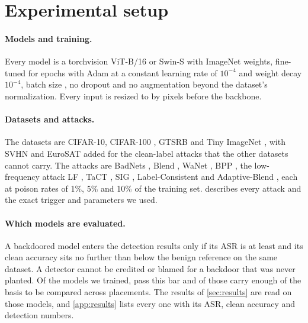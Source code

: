 \section{Experimental setup}
\label{sec:setup}

\paragraph{Models and training.}
Every model is a torchvision \cite{paszke2019pytorch} ViT-B/16 or Swin-S with ImageNet weights, fine-tuned for \TrainingEpochs{} epochs with Adam \cite{kingma2015adam} at a constant learning rate of $10^{-4}$ and weight decay $10^{-4}$, batch size \TrainingBatchSize{}, no dropout and no augmentation beyond the dataset's normalization. Every input is resized to \ModelInputSize{} by \ModelInputSize{} pixels before the backbone.

\paragraph{Datasets and attacks.}
The datasets are CIFAR-10, CIFAR-100 \cite{krizhevsky2009cifar}, GTSRB \cite{stallkamp2012gtsrb} and Tiny ImageNet \cite{le2015tiny}, with SVHN \cite{netzer2011svhn} and EuroSAT \cite{helber2019eurosat} added for the clean-label attacks that the other datasets cannot carry. The attacks are BadNets \cite{gu2017badnets}, Blend \cite{chen2017targeted}, WaNet \cite{nguyen2021wanet}, BPP \cite{wang2022bpp}, the low-frequency attack LF \cite{zeng2021lf}, TaCT \cite{tang2021demon}, SIG \cite{barni2019sig}, Label-Consistent \cite{turner2019label} and Adaptive-Blend \cite{qi2023adaptive}, each at poison rates of 1\%, 5\% and 10\% of the training set.  describes every attack and the exact trigger and parameters we used.

\paragraph{Which models are evaluated.}
A backdoored model enters the detection results only if its ASR is at least \AsrBar{} and its clean accuracy sits no further than \CleanDropBar{} below the benign reference on the same dataset. A detector cannot be credited or blamed for a backdoor that was never planted. Of the \PanelCellsTotal{} models we trained, \PanelCellsClearing{} pass this bar and \PanelCellsCached{} of those carry enough of the basis to be compared across placements. The results of \cref{sec:results} are read on those \PanelCellsCached{} models, and \cref{app:results} lists every one with its ASR, clean accuracy and detection numbers.

